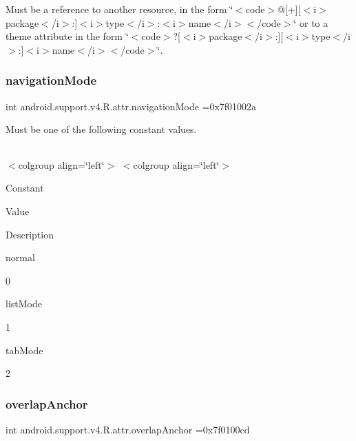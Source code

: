 Must be a reference to another resource, in the form \char`\"{}$<$code$>$@\mbox{[}+\mbox{]}\mbox{[}$<$i$>$package$<$/i$>$\+:\mbox{]}$<$i$>$type$<$/i$>$\+:$<$i$>$name$<$/i$>$$<$/code$>$\char`\"{} or to a theme attribute in the form \char`\"{}$<$code$>$?\mbox{[}$<$i$>$package$<$/i$>$\+:\mbox{]}\mbox{[}$<$i$>$type$<$/i$>$\+:\mbox{]}$<$i$>$name$<$/i$>$$<$/code$>$\char`\"{}. \mbox{\label{classandroid_1_1support_1_1v4_1_1R_1_1attr_a1777f34b52b7f62ca810e74432643515}} 
\subsubsection{\texorpdfstring{navigation\+Mode}{navigationMode}}
{\footnotesize\ttfamily int android.\+support.\+v4.\+R.\+attr.\+navigation\+Mode =0x7f01002a\hspace{0.3cm}{\ttfamily [static]}}

Must be one of the following constant values.

\tabulinesep=1mm
\begin{longtabu} spread 0pt [c]{*{0}{|X[-1]}|}
\hline
\end{longtabu}
$<$colgroup align=\char`\"{}left\char`\"{}$>$ $<$colgroup align=\char`\"{}left\char`\"{}$>$ 

Constant

Value

Description 

{\ttfamily normal}

0

{\ttfamily list\+Mode}

1

{\ttfamily tab\+Mode}

2\mbox{\label{classandroid_1_1support_1_1v4_1_1R_1_1attr_a0c8163501c5bda57b67869aa588edc63}} 
\subsubsection{\texorpdfstring{overlap\+Anchor}{overlapAnchor}}
{\footnotesize\ttfamily int android.\+support.\+v4.\+R.\+attr.\+overlap\+Anchor =0x7f0100cd\hspace{0.3cm}{\ttfamily [static]}}

